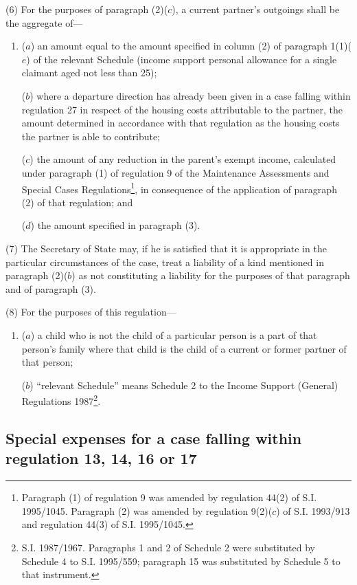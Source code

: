 \documentclass[a4paper]{article}
\begin{document}
(6) For the purposes of paragraph (2)($c$), a current partner’s outgoings shall be the aggregate of—
\begin{enumerate}\item[]
($a$) an amount equal to the amount specified in column (2) of paragraph 1(1)($e$) of the relevant Schedule (income support personal allowance for a single claimant aged not less than 25);

($b$) where a departure direction has already been given in a case falling within regulation 27 in respect of the housing costs attributable to the partner, the amount determined in accordance with that regulation as the housing costs the partner is able to contribute;

($c$) the amount of any reduction in the parent’s exempt income, calculated under paragraph (1) of regulation 9 of the Maintenance Assessments and Special Cases Regulations\footnote{\frenchspacing Paragraph (1) of regulation 9 was amended by regulation 44(2) of S.I. 1995/1045. Paragraph (2) was amended by regulation 9(2)($c$) of S.I. 1993/913 and regulation 44(3) of S.I. 1995/1045.}, in consequence of the application of paragraph (2) of that regulation; and

($d$) the amount specified in paragraph (3).
\end{enumerate}

(7) The Secretary of State may, if he is satisfied that it is appropriate in the particular circumstances of the case, treat a liability of a kind mentioned in paragraph (2)($b$) as not constituting a liability for the purposes of that paragraph and of paragraph (3).

(8) For the purposes of this regulation—
\begin{enumerate}\item[]
($a$) a child who is not the child of a particular person is a part of that person’s family where that child is the child of a current or former partner of that person;

($b$) “relevant Schedule” means Schedule 2 to the Income Support (General) Regulations 1987\footnote{\frenchspacing S.I. 1987/1967. Paragraphs 1 and 2 of Schedule 2 were substituted by Schedule 4 to S.I. 1995/559; paragraph 15 was substituted by Schedule 5 to that instrument.}.
\end{enumerate}

\subsection[19. Special expenses for a case falling within regulation 13, 14, 16 or 17]{Special expenses for a case falling within regulation 13, 14, 16 or 17}
\end{document}
